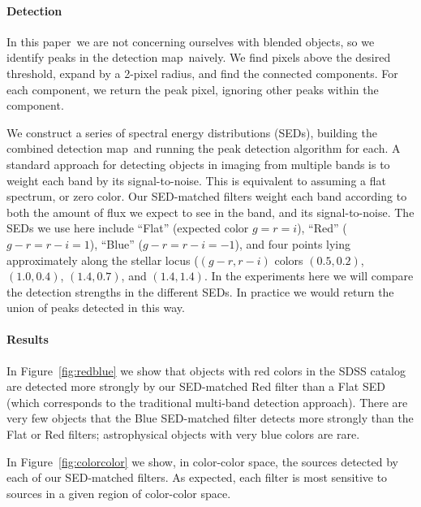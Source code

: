 \documentclass[letterpaper,preprint]{aastex}
\newcommand{\doctype}{paper}
\newcommand{\fig}{Figure}
\newcommand{\figref}[1]{\mbox{\fig~\ref{#1}}}
\newcommand{\detmap}{detection map}
\begin{document}
\paragraph{Detection}
In this \doctype\ we are not concerning ourselves with blended
objects, so we identify peaks in the \detmap\ naively.  We find
pixels above the desired threshold, expand by a 2-pixel radius, and
find the connected components.  For each component, we return the peak
pixel, ignoring other peaks within the component.


We construct a series of spectral energy distributions (SEDs),
building the combined \detmap\ and running the peak detection
algorithm for each.  A standard approach for detecting objects in
imaging from multiple bands is to weight each band by its
signal-to-noise.  This is equivalent to assuming a flat spectrum, or
zero color.  Our SED-matched filters weight each band according to
both the amount of flux we expect to see in the band, and its
signal-to-noise.  The SEDs we use here include ``Flat'' (expected
color $g = r = i$), ``Red'' ($g-r = r-i = 1$), ``Blue'' ($g-r = r-i =
-1$), and four points lying approximately along the stellar locus
($(g-r, r-i)$ colors $(0.5,0.2)$, $(1.0,0.4)$, $(1.4,0.7)$, and
$(1.4,1.4)$.  In the experiments here we will compare the detection
strengths in the different SEDs.  In practice we would return the
union of peaks detected in this way.




\paragraph{Results}
In \figref{fig:redblue} we show that objects with red colors in the
SDSS catalog are detected more strongly by our SED-matched Red filter
than a Flat SED (which corresponds to the traditional multi-band
detection approach).  There are very few objects that the Blue
SED-matched filter detects more strongly than the Flat or Red filters;
astrophysical objects with very blue colors are rare.

In \figref{fig:colorcolor} we show, in color-color space, the sources
detected by each of our SED-matched filters.  As expected, each filter
is most sensitive to sources in a given region of color-color space.

\end{document}
